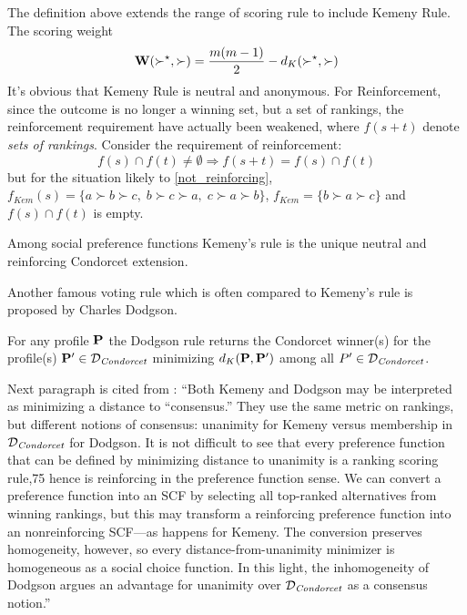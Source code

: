 The definition above extends the range of scoring rule to include Kemeny Rule. The scoring weight $$\mathbf{W}(\succ^\star, \succ) = \frac{m(m-1)}{2} - d_K(\succ^\star,\succ)$$
It's obvious that Kemeny Rule is neutral and anonymous. For Reinforcement, since the outcome is no longer a winning set, but a set of rankings, the reinforcement requirement have actually been weakened, where $f(s+t)$ denote \emph{sets of rankings}. Consider the requirement of reinforcement:
$$
f(s) \cap f(t) \neq \emptyset \Rightarrow f(s+t) = f(s) \cap f(t)
$$
but for the situation likely to \cref{not_reinforcing}, $f_{\textit{Kem}}(s) = \{a \succ b \succ c,\; b \succ c \succ a,\; c \succ a \succ b\}$, $f_{\textit{Kem}} = \{b \succ a \succ c\}$ and $f(s) \cap f(t)$ is empty.

\begin{theorem}
    Among social preference functions Kemeny's rule is the unique neutral and reinforcing Condorcet extension.
\end{theorem}

Another famous voting rule which is often compared to Kemeny's rule is proposed by Charles Dodgson.

\begin{definition}
    For any profile $\mathbf{P}$ the Dodgson rule returns the Condorcet winner(s) for the profile(s) $\mathbf{P}' \in \mathcal{D}_\textit{Condorcet}$ minimizing $d_K (\mathbf{P},\mathbf{P}')$ among all $P' \in \mathcal{D}_\textit{Condorcet}$.
\end{definition}

Next paragraph is cited from \textcite{moulinHandbookComputationalSocial2016}:
``Both Kemeny and Dodgson may be interpreted as minimizing a distance to “consensus.” They use the same metric on rankings, but different notions of consensus: unanimity for Kemeny versus membership in $\mathcal{D}_\textit{Condorcet}$ for Dodgson. It is not difficult to see that every preference function that can be defined by minimizing distance to unanimity is a ranking scoring rule,75 hence is reinforcing in the preference function sense. We can convert a preference function into an SCF by selecting all top-ranked alternatives from winning rankings, but this may transform a reinforcing preference function into an nonreinforcing SCF—as happens for Kemeny. The conversion preserves homogeneity, however, so every distance-from-unanimity minimizer is homogeneous as a social choice function. In this light, the inhomogeneity of Dodgson argues an advantage for unanimity over $\mathcal{D}_\textit{Condorcet}$ as a consensus notion.''